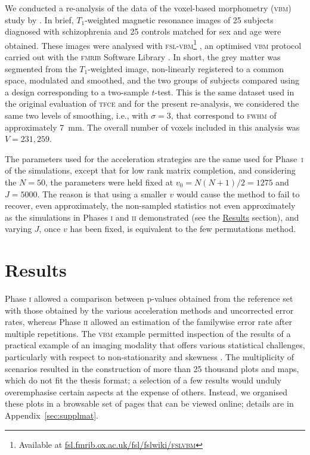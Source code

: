 We conducted a re-analysis of the data of the voxel-based morphometry (\textsc{vbm}) study by \citet{Douaud2007}. In brief, $T_1$-weighted magnetic resonance images of 25 subjects diagnosed with schizophrenia and 25 controls matched for sex and age were obtained. These images were analysed with \textsc{fsl-vbm}\footnote{Available at \href{http://fsl.fmrib.ox.ac.uk/fsl/fslwiki/FSLVBM}{fsl.fmrib.ox.ac.uk/fsl/fslwiki/\textsc{fslvbm}}} \citep{Douaud2007}, an optimised \textsc{vbm} protocol \citep{Good2001} carried out with the \textsc{fmrib} Software Library \citep[\textsc{fsl;}][]{Smith2004}. In short, the grey matter was segmented from the $T_1$-weighted image, non-linearly registered to a common space, modulated and smoothed, and the two groups of subjects compared using a design corresponding to a two-sample $t$-test. This is the same dataset used in the original evaluation of \textsc{tfce} \citep{Smith2009} and for the present re-analysis, we considered the same two levels of smoothing, i.e., with $\sigma=3$, that correspond to \textsc{fwhm} of approximately 7~mm. The overall number of voxels included in this analysis was $V = 231,259$.

The parameters used for the acceleration strategies are the same used for Phase~\textsc{i} of the simulations, except that for low rank matrix completion, and considering the $N=50$, the parameters were held fixed at $v_0=N(N+1)/2=1275$ and $J=5000$. The reason is that using a smaller $v$ would cause the method to fail to recover, even approximately, the non-sampled statistics not even approximately as the simulations in Phases \textsc{i} and \textsc{ii} demonstrated (see the \href{sec:accel:results}{Results} section), and varying $J$, once $v$ has been fixed, is equivalent to the few permutations method.

\section{Results}
\label{sec:accel:results}

Phase \textsc{i} allowed a comparison between p-values obtained from the reference set with those obtained by the various acceleration methods and uncorrected error rates, whereas Phase \textsc{ii} allowed an estimation of the familywise error rate after multiple repetitions. The \textsc{vbm} example permitted inspection of the results of a practical example of an imaging modality that offers various statistical challenges, particularly with respect to non-stationarity \citep{Hayasaka2004, Salimi-Khorshidi2011} and skewness \citep{Salmond2002, Viviani2007}. The multiplicity of scenarios resulted in the construction of more than 25 thousand plots and maps, which do not fit the thesis format; a selection of a few results would unduly overemphasise certain aspects at the expense of others. Instead, we organised these plots in a browsable set of pages that can be viewed online; details are in Appendix~\ref{sec:supplmat}.

